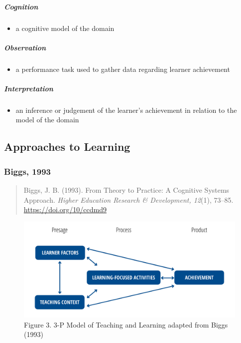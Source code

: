 \documentclass[
]{book}
\providecommand{\tightlist}{%
  \setlength{\itemsep}{0pt}\setlength{\parskip}{0pt}}
\begin{document}
\hypertarget{cognition}{%
\subparagraph*{Cognition}\label{cognition}}

\begin{itemize}
\tightlist
\item
  a cognitive model of the domain
\end{itemize}

\hypertarget{observation}{%
\subparagraph*{Observation}\label{observation}}

\begin{itemize}
\tightlist
\item
  a performance task used to gather data regarding learner achievement
\end{itemize}

\hypertarget{interpretation}{%
\subparagraph*{Interpretation}\label{interpretation}}

\begin{itemize}
\tightlist
\item
  an inference or judgement of the learner's achievement in relation to the model of the domain
\end{itemize}

\hypertarget{approaches-to-learning}{%
\subsection*{Approaches to Learning}\label{approaches-to-learning}}

\hypertarget{biggs-1993}{%
\subsubsection*{Biggs, 1993}\label{biggs-1993}}

\begin{quote}
Biggs, J. B. (1993). From Theory to Practice: A Cognitive Systems Approach. \emph{Higher Education Research \& Development, 12}(1), 73--85. \url{https://doi.org/10/ccdmd9}
\end{quote}

\begin{figure}
\centering
\includegraphics{assets/otessa22/3p-model.png}
\caption{Figure 3. 3-P Model of Teaching and Learning adapted from Biggs (1993)}
\end{figure}
\end{document}
